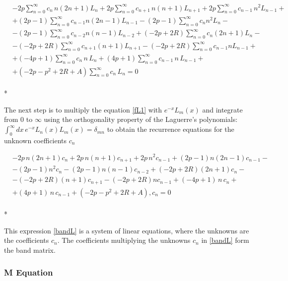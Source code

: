 \begin{equation}\label{fL1}
\begin{split}
& -2p\sum_{n=0}^{\infty}{c_n\,n(2n+1)L_n}  + 2p\sum_{n=0}^{\infty}{c_{n+1}\,n(n+1)L_{n+1}}+2p\sum_{n=0}^{\infty}{c_{n-1}\,n^2L_{n-1}} + \\[.8em] 
& + (2p-1)\sum_{n=0}^{\infty}{c_{n-1}n(2n-1)L_{n-1}} - (2p-1)\sum_{n=0}^{\infty}{c_{n}n^2L_n}- \\[.8em]
& - (2p-1)\sum_{n=0}^{\infty}{c_{n-2}n(n-1)L_{n-2}} + (-2p+2R)\sum_{n=0}^{\infty}{c_n(2n+1)L_n} -  \\[.8em]
& - (-2p+2R)\sum_{n=0}^{\infty}{c_{n+1}(n+1)L_{n+1}} - (-2p+2R)\sum_{n=0}^{\infty}{c_{n-1}n L_{n-1}} + \\[.8em] 
& + (-4p + 1)\sum_{n=0}^{\infty}{c_n\,n\,L_n } + (4p+1)\sum_{n=0}^{\infty}{c_{n-1}\,n\,L_{n-1}}  +  \\[.8em]
& + (-2p - p^2 + 2R + A)\sum_{n=0}^{\infty}{c_n\,L_ n} = 0 
\end{split} 
\end{equation}\\*

The next step is to multiply the equation \eqref{fL1} with $ e^{-x}L_m(x) $ and integrate from $ 0 $ to $ \infty $ using the orthogonality property of the Laguerre's polynomials: $ \int_0^{\infty}{dx\,e^{-x}L_n(x)L_m(x)} = \delta_{mn} $ to obtain the recurrence equations for the unknown coefficients $ c_n $

\begin{equation}\label{bandL}
\begin{split}
& -2p\,n(2n+1)c_n  + 2p\,n(n+1)c_{n+1}+2p\,n^2c_{n-1} + (2p-1)n(2n-1)c_{n-1}-  \\[.8em]
& - (2p-1)n^2c_n-(2p-1)n(n-1)c_{n-2} +(-2p+2R)(2n+1)c_n - \\[.8em]
& - (-2p+2R)(n+1)c_{n+1} - (-2p+2R)n c_{n-1} + (-4p + 1)\,n\,c_n +  \\[.8em]
&  + (4p+1)\,n\,c_{n-1} + (-2p - p^2 + 2R + A),c_ n = 0 
\end{split} 
\end{equation}\\*

This expression \eqref{bandL} is  a system of linear equations, where the unknowns are the coefficients $ c_n $. The coefficients multiplying the unknowns $ c_n $ in \eqref{bandL} form the band matrix.


\subsubsection{M  Equation}

